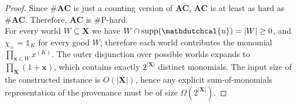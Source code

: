 \documentclass[10pt,a4paper]{scrartcl}
\theoremstyle{definition}
\theoremstyle{remark}
\begin{document}
\begin{proof}
  Since \#\textbf{AC} is just a counting version of \textbf{AC}, \textbf{AC} is at least as hard as \#\textbf{AC}. Therefore, \textbf{AC} is \#P-hard. \\
  For every world \(W\subseteq\mathbf{X}\) we have
  \(W\cap\mathrm{supp}(\mathdutchcal{u})=|W|\ge0\), and
  \(\chi_= = \mathbb{1}_K\) for every good \(W\); therefore each world contributes the monomial
  \(\prod_{\textbf{x}\in W} x^{(K)}\). The outer disjunction over possible worlds expands to \(\prod_\mathbf{X}(1+\mathbf{x})\), which
  contains exactly \(2^{|\mathbf{X}|}\) distinct monomials. The input size
  of the constructed instance is \(O(|\mathbf{X}|)\),
  hence any explicit sum-of-monomials representation of the provenance must be of size
  \(\Omega(2^{|\mathbf{X}|})\).

\end{proof}
\end{document}
